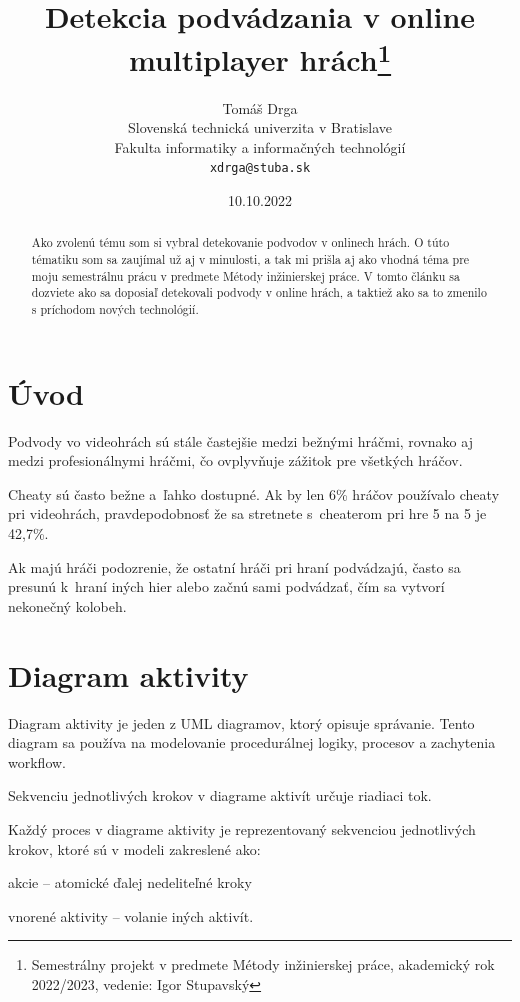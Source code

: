\documentclass[10pt,twoside,slovak,a4paper]{article}
\title{Detekcia podvádzania v online multiplayer hrách\thanks{Semestrálny projekt v predmete Métody inžinierskej práce, akademický rok 2022/2023, vedenie: Igor Stupavský}}
\author{Tomáš Drga\\[2pt]
	{\small Slovenská technická univerzita v Bratislave}\\
	{\small Fakulta informatiky a informačných technológií}\\
	{\small \texttt{xdrga@stuba.sk}}
	}
\date{\small 10.10.2022}
\begin{document}
\maketitle

\begin{abstract}
Ako zvolenú tému som si vybral detekovanie podvodov v onlinech hrách. O túto tématiku som sa zaujímal už aj v minulosti, a tak mi prišla aj ako vhodná téma pre moju semestrálnu prácu v predmete Métody inžinierskej práce. V tomto článku sa dozviete ako sa doposiaľ detekovali podvody v online hrách, a taktiež ako sa to zmenilo s príchodom nových technológií.
\end{abstract}


\section{Úvod}\label{uxfavod}

Podvody vo videohrách sú stále častejšie medzi bežnými hráčmi, rovnako
aj medzi profesionálnymi hráčmi, čo ovplyvňuje zážitok pre všetkých
hráčov. 

Cheaty sú často bežne a~ľahko dostupné. Ak by len 6\% hráčov
používalo cheaty pri videohrách, pravdepodobnosť že sa stretnete
s~cheaterom pri hre 5 na 5 je 42,7\%\cite{pravdepodobnost}. 

Ak majú hráči podozrenie, že ostatní hráči pri hraní podvádzajú, často sa presunú k~hraní iných hier alebo začnú sami podvádzať, čím sa vytvorí nekonečný kolobeh.


\section{Diagram aktivity}\label{uxfavod}

Diagram aktivity je jeden z UML diagramov, ktorý opisuje správanie. Tento diagram sa používa na modelovanie procedurálnej logiky, procesov a zachytenia workflow.

Sekvenciu jednotlivých krokov v diagrame aktivít určuje riadiaci tok.

Každý proces v diagrame aktivity je reprezentovaný sekvenciou jednotlivých krokov, ktoré sú v modeli zakreslené ako:

akcie – atomické ďalej nedeliteľné kroky


vnorené aktivity – volanie iných aktivít.
\end{document}
